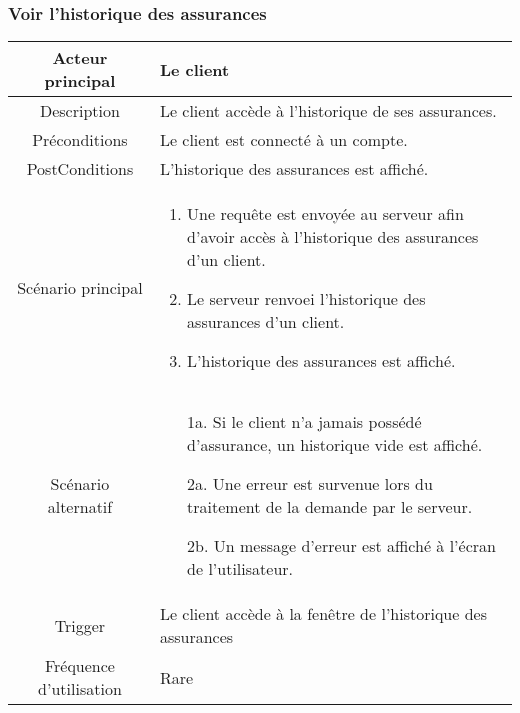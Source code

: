 \documentclass{article}
\begin{document}
\newpage

\subsubsection{Voir l'historique des assurances}
\begin{table}[h]
    \begin{tabular}{|c|p{10cm}|}
       \hline
       Acteur principal&Le client\\
       \hline
       Description&Le client accède à l'historique de ses assurances.\\
       \hline
       Préconditions&Le client est connecté à un compte.\\
       \hline
       PostConditions&L'historique des assurances est affiché.\\
       \hline
       Scénario principal& 
             \begin{enumerate}
                \item Une requête est envoyée au serveur afin d'avoir accès à l'historique des assurances d'un client.
                \item Le serveur renvoei l'historique des assurances d'un client.
                \item L'historique des assurances est affiché.
             \end{enumerate}     \\
       \hline
       Scénario alternatif&
        \begin{itemize}
            \item[1a.] Si le client n'a jamais possédé d'assurance, un historique vide est affiché.
            \item[2a.] Une erreur est survenue lors du traitement de la demande par le serveur.
            \item[2b.] Un message d'erreur est affiché à l'écran de l'utilisateur. 
        \end{itemize}
       \\
       \hline
       Trigger&Le client accède à la fenêtre de l'historique des assurances\\
       \hline
       Fréquence d'utilisation&Rare\\
       \hline
    \end{tabular}
 \end{table}

\newpage

\end{document}
